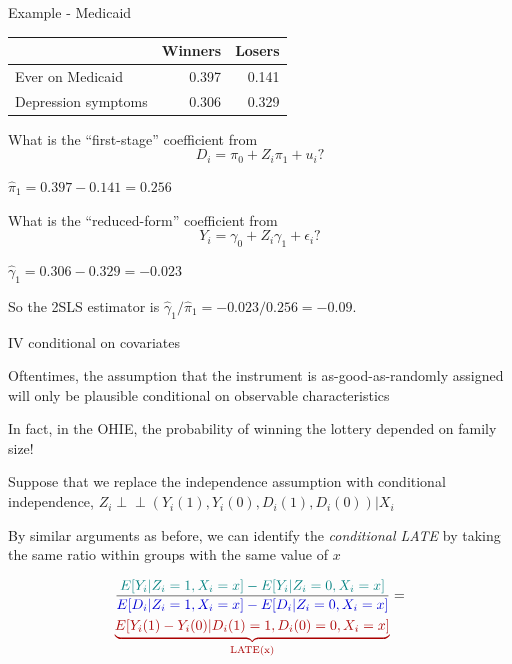 \documentclass[11pt,english,handout]{beamer}
\newenvironment{wideitemize}{\itemize\addtolength{\itemsep}{10pt}}{\enditemize}
\newcommand{\indep}{\perp\!\!\!\!\perp}
\begin{document}
\begin{frame}{Example - Medicaid}
	\begin{tabular}{lrr}
		& Winners & Losers \\ \hline
		Ever on Medicaid & 0.397 & 0.141 \\
		Depression symptoms & 0.306 &  0.329 
	\end{tabular}
	
	\bigskip 
	\begin{wideitemize}
		\item
		What is the ``first-stage'' coefficient from 
		$$D_i = \pi_0 + Z_i \pi_1 + u_i?$$
		
		\pause
		\item
		$\hat\pi_1 = 0.397 - 0.141 = 0.256$
		
		\pause
		\item
		What is the ``reduced-form'' coefficient from 
		$$Y_i = \gamma_0 + Z_i \gamma_1 + \epsilon_i?$$
		
		\pause
		\item
		$\hat\gamma_1 = 0.306 - 0.329 = -0.023$
		
		\pause
		\item
		So the 2SLS estimator is $\hat\gamma_1/\hat\pi_1 = -0.023/0.256 = -0.09$.
	\end{wideitemize}
	
\end{frame}


\begin{frame}{IV conditional on covariates}
	\begin{wideitemize}
		\item
		Oftentimes, the assumption that the instrument is as-good-as-randomly assigned will only be plausible conditional on observable characteristics
		
		\item
		In fact, in the OHIE, the probability of winning the lottery depended on family size!
		
		\pause
		\item
		Suppose that we replace the independence assumption with conditional independence, $Z_i \indep (Y_i(1),Y_i(0),D_i(1), D_i(0)) | X_i$
		
		\item
		By similar arguments as before, we can identify the \textit{conditional LATE} by taking the same ratio within groups with the same value of $x$
		
		\begin{align*}
			&\dfrac{ \color{teal} E[Y_i | Z_i = 1, X_i = x] - E[Y_i | Z_i = 0, X_i = x ]  }{  \color{blue} E[D_i | Z_i = 1, X_i = x] - E[D_i | Z_i = 0 , X_i = x]   }  = \\&{ \color{red}  \underbrace{ E[Y_i(1) - Y_i(0) | D_i(1) = 1, D_i(0) = 0, X_i = x] }_{\text{LATE(x)}} }
		\end{align*}
		
		
	\end{wideitemize}	
\end{frame}
\end{document}
